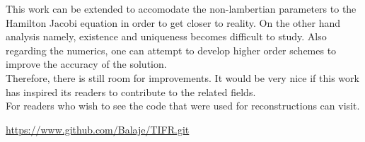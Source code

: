 \documentclass{report}[14pt]
\begin{document}
	\noindent
	This work can be extended to accomodate the non-lambertian parameters to the Hamilton Jacobi equation in order to get closer to reality. On the other hand analysis namely, existence and uniqueness becomes difficult to study. Also regarding the numerics, one can attempt to develop higher order schemes to improve the accuracy of the solution.\\
	
	\noindent 
	Therefore, there is still room for improvements. It would be very nice if this work has
	inspired its readers to contribute to the related fields. \\
	
	\noindent
	For readers who wish to see the code that were used for reconstructions can visit.
	\begin{center}
		\href{https://www.github.com/Balaje/TIFR.git}{https://www.github.com/Balaje/TIFR.git}
	\end{center}
	
	\nocite{*}
	
	
\end{document}
